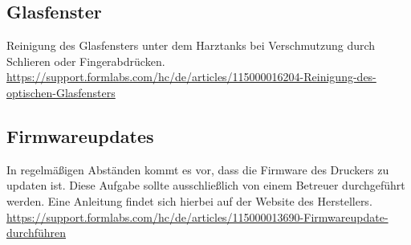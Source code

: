 \documentclass{\basedir/fablab-document}
\begin{document}
		\subsection{Glasfenster}
		Reinigung des Glasfensters unter dem Harztanks bei Verschmutzung durch Schlieren oder Fingerabdrücken.\\ \url{https://support.formlabs.com/hc/de/articles/115000016204-Reinigung-des-optischen-Glasfensters}
	
	\subsection{Firmwareupdates}
	
In regelmäßigen Abständen kommt es vor, dass die Firmware des Druckers zu updaten ist. Diese Aufgabe sollte ausschließlich von einem Betreuer durchgeführt werden. Eine Anleitung findet sich hierbei auf der Website des Herstellers.\\	
		\url{https://support.formlabs.com/hc/de/articles/115000013690-Firmwareupdate-durchführen}
	
\end{document}
